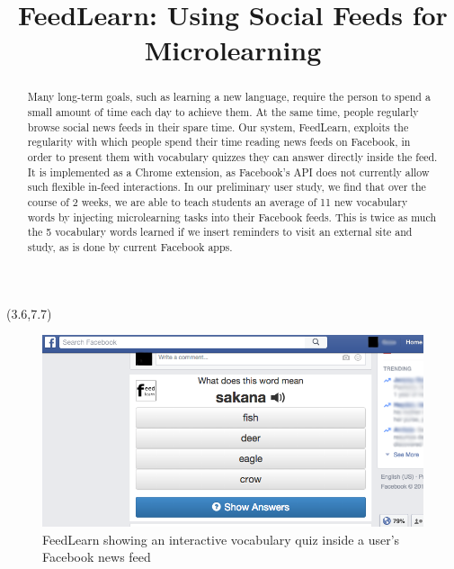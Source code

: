 \documentclass{chi-ext}
\title{FeedLearn: Using Social Feeds for Microlearning}
\author{
  \alignauthor{
  	\textbf{Geza Kovacs}\\
  	\affaddr{Department of Computer Science, Stanford University}\\
  	\email{geza@cs.stanford.edu}
  }
}
\begin{document}
\maketitle

\begin{textblock}{5}(3.6,7.7)
\begin{figure}
\includegraphics[width=\columnwidth]{feedlearn-screenshot.png}
\caption{FeedLearn showing an interactive vocabulary quiz inside a user's Facebook news feed}
\end{figure}
\end{textblock}

\begin{abstract}
Many long-term goals, such as learning a new language,
require the person to spend a small amount of time each day to achieve them.
At the same time, people regularly browse social news feeds in their spare time.
Our system, FeedLearn, exploits the regularity with which people spend their time reading news feeds on Facebook,
in order to present them with vocabulary quizzes they can answer directly inside the feed.
It is implemented as a Chrome extension, as Facebook's API does not currently allow such flexible
in-feed interactions.
In our preliminary user study, we find that over the course of 2 weeks, we are able to teach students an average of 11 new vocabulary words by injecting microlearning tasks into their Facebook feeds. This is twice as much the 5 vocabulary words learned if we insert reminders to visit an external site and study, as is done by current Facebook apps.
\end{abstract}
\end{document}
